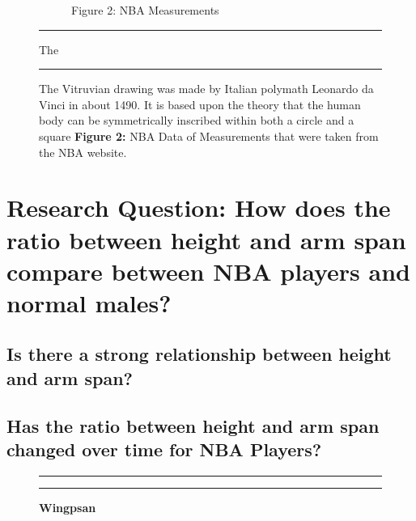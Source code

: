 \documentclass[]{article}
\begin{document}
\begin{figure}[!ht]
\begin{subfigure}[h]{0.4\textwidth}
            \caption{Figure 2: NBA Measurements}
        \label{fig:sub-second}
    \end{subfigure}
    \vspace{2.5mm}
    \hrule
    \vspace{2.5mm}
        \caption{\textbf{  }The Vitruvian drawing was made by Italian polymath Leonardo da Vinci in about 1490. It is based upon the theory that the human body can be symmetrically inscribed within both a circle and a square \newline  \newline   \textbf{Figure 2:} NBA Data of Measurements that were taken from the NBA website. }
        The
        \newline  \newline 
        \label{fig:combined}
    \vspace{-2.5mm}
    \hrule
\end{figure}

\newpage

\section{Research Question: How does the ratio between height and arm span compare between NBA players and normal males?}
\label{sec:rq}

\subsection{Is there a strong relationship between height and arm span?}
\label{sec:rq2}

\subsection{Has the ratio between height and arm span changed over time for NBA Players?}
\label{sec:rq3}

\begin{figure}[!ht]
    \hrule
    \caption{ \textbf{Wingpsan} }
    \begin{center}
    \end{center}
    \label{fig:handout-1}
    \hrule
\end{figure}
\end{document}
